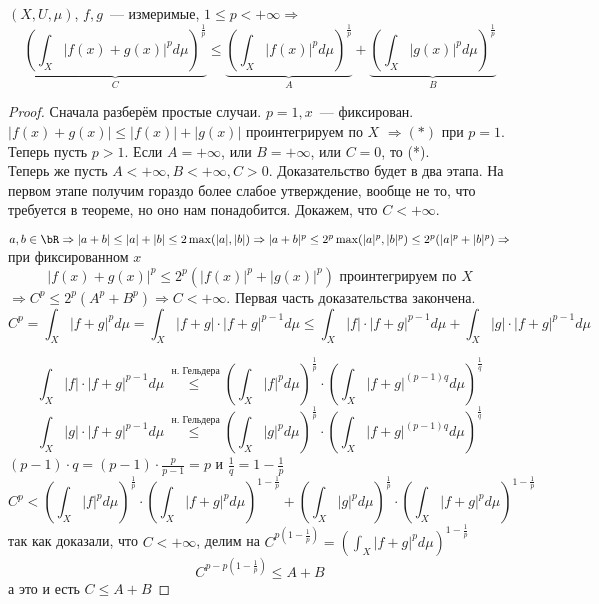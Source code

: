 \documentclass[document]{subfiles}
\begin{document}
\begin{theorem}
    $(X, U, \mu)$, $f, g$~--- измеримые, $1 \leq p < + \infty \Rightarrow$
    \[ \underbrace{\left( \int_X |f(x) + g(x)|^p d \mu \right)^{\frac{1}{p}}}_{C}  \leq \underbrace{\left( \int_X |f(x)|^p d \mu \right)^{\frac{1}{p}}}_{A} + 
    \underbrace{\left( \int_X |g(x)|^p d \mu \right)^{\frac{1}{p}}}_{B} \tag{*} \]
    
\end{theorem}
\begin{proof}
    Сначала разберём простые случаи. $p = 1, x$~--- фиксирован. $|f(x) + g(x)| \leq |f(x)| + |g(x)|$ проинтегрируем по $X$ $\Rightarrow (*)$ при $p = 1$.
    Теперь пусть $p > 1$. Если $A = +\infty$, или $B = +\infty$, или $C = 0$, то (*). \\
    Теперь же пусть $A < +\infty, B < +\infty, C > 0$. 
    Доказательство будет в два этапа. На первом этапе получим гораздо более слабое утверждение, вообще не то, что требуется в теореме, но оно нам понадобится.
    Докажем, что $C < + \infty$.
    
    $a,b \in \bR \Rightarrow |a+b| \leq |a| + |b| \leq 2 \max(|a|, |b|) \Rightarrow |a+b|^p \leq 2^p \max(|a|^p, |b|^p) \leq 2^p(|a|^p + |b|^p) \Rightarrow$
    при фиксированном $x$ 
    \[ |f(x) + g(x) |^p \leq 2^p (|f(x)|^p + |g(x)|^p) \text{ проинтегрируем по } X \]
    $\Rightarrow C^p \leq 2^p(A^p + B^p) \Rightarrow C < + \infty$.
    Первая часть доказательства закончена. \\
    \[ C^p = \int_X |f+g|^p d \mu = \int_X |f+g| \cdot |f + g|^{p-1} d \mu \leq \int_X |f| \cdot |f+g|^{p-1} d\mu + \int_X |g| \cdot |f+g|^{p-1} d \mu \]

    \[ \int_X |f| \cdot |f+g|^{p-1} d\mu \stackrel{\text{ н. Гельдера}}{\leq} \left( \int_X |f|^p d\mu \right)^{\frac{1}{p}} \cdot \left( \int_X |f+g|^{(p-1)q} d\mu \right)^{\frac{1}{q}} \]
    \[ \int_X |g| \cdot |f+g|^{p-1} d\mu \stackrel{\text{ н. Гельдера}}{\leq} \left( \int_X |g|^p d\mu \right)^{\frac{1}{p}} \cdot \left( \int_X |f+g|^{(p-1)q} d\mu \right)^{\frac{1}{q}} \]
    $(p-1) \cdot q = (p-1) \cdot \frac{p}{p-1} = p$ и $\frac{1}{q} = 1 - \frac{1}{p}$
    \[ C^p <  \left( \int_X |f|^p d\mu \right)^{\frac{1}{p}} \cdot \left( \int_X |f+g|^{p} d\mu \right)^{1 - \frac{1}{p}} + \left( \int_X |g|^p d\mu \right)^{\frac{1}{p}} \cdot \left( \int_X |f+g|^{p} d\mu \right)^{1 - \frac{1}{p}} \]
    так как доказали, что $C < +\infty$, делим на $C^{p\left(1-\frac{1}{p}\right)} = \left( \int_X |f+g|^{p} d\mu \right)^{1 - \frac{1}{p}}$
    \[ C^{p-p\left(1-\frac{1}{p}\right)} \leq A + B \] 
    а это и есть $C \leq A + B$
\end{proof}
\end{document}
